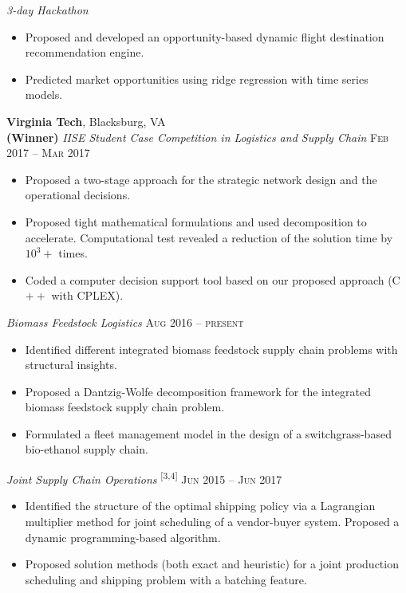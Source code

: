 \documentclass[letterpaper,10pt]{article}
\begin{document}
 
\textit{3-day Hackathon}
\begin{itemize}
	\item Proposed and developed an opportunity-based dynamic flight destination recommendation engine. 
	\item Predicted market opportunities using ridge regression with time series models.
\end{itemize}


\medskip
\textbf{Virginia Tech}, Blacksburg, VA  \\
\textbf{(Winner)}\textit{ IISE Student Case Competition in Logistics and Supply Chain}  \hfill{\textsc{Feb 2017 -- Mar 2017}}
\begin{itemize}
	\item Proposed a two-stage approach for the strategic network design and the operational decisions. 
	\item Proposed tight mathematical formulations and used decomposition to accelerate. Computational test revealed a reduction of the solution time by $10^3 +$ times.
	\item Coded a computer decision support tool based on our proposed approach (C$++$ with CPLEX). 
\end{itemize}

 
\textit{Biomass Feedstock Logistics}    \hfill{\textsc{Aug 2016 -- present}} 
\begin{itemize}
	\item Identified different integrated biomass feedstock supply chain problems with structural insights.
	\item Proposed a Dantzig-Wolfe decomposition framework for the integrated biomass feedstock supply chain problem.
	\item Formulated a fleet management model in the design of a switchgrass-based bio-ethanol supply chain.
\end{itemize}

 
\textit{Joint Supply Chain Operations} \textsuperscript{[3,4]}   \hfill{\textsc{Jun 2015 -- Jun 2017}} 
\begin{itemize}
	\item Identified the structure of the optimal shipping policy via a Lagrangian multiplier method for joint scheduling of a vendor-buyer system. Proposed a dynamic programming-based algorithm.
	\item Proposed solution methods (both exact and heuristic) for a joint production scheduling and shipping problem with a batching feature.
\end{itemize}
\end{document}
